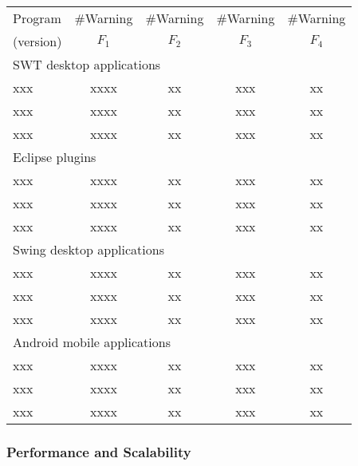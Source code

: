 \begin{table}[t]
\begin{center}
 \fontsize{9pt}{\baselineskip}\selectfont
\hspace*{-0.2cm}
\begin{tabular}{|l||c|c|c|c|}
\hline
 Program  & \#Warning & \#Warning & \#Warning & \#Warning \\
 (version) & $F_1$ & $F_2$ & $F_3$&$F_4$ \\
\hline \hline
\multicolumn{5}{|l|}{SWT desktop applications}   \\
 \hline
 xxx &  xxxx &  xx &  xxx & xx \\
 \hline
 xxx &  xxxx &  xx &  xxx & xx \\
 \hline
 xxx &  xxxx &  xx &  xxx & xx \\
 \hline
 \hline
\multicolumn{5}{|l|}{Eclipse plugins}   \\
 \hline
 xxx &  xxxx &  xx &  xxx & xx \\
 \hline
 xxx &  xxxx &  xx &  xxx & xx \\
 \hline
 xxx &  xxxx &  xx &  xxx & xx \\
 \hline
 \hline
\multicolumn{5}{|l|}{Swing desktop applications}   \\
 \hline
 xxx &  xxxx &  xx &  xxx & xx \\
 \hline
 xxx &  xxxx &  xx &  xxx & xx \\
 \hline
 xxx &  xxxx &  xx &  xxx & xx \\
 \hline
 \hline
\multicolumn{5}{|l|}{Android mobile applications}   \\
 \hline
 xxx &  xxxx &  xx &  xxx & xx \\
 \hline
 xxx &  xxxx &  xx &  xxx & xx \\
 \hline
 xxx &  xxxx &  xx &  xxx & xx \\
\hline
\end{tabular}
\end{center}
\vspace{-15pt}
\end{table}


\subsubsection{Performance and Scalability}

